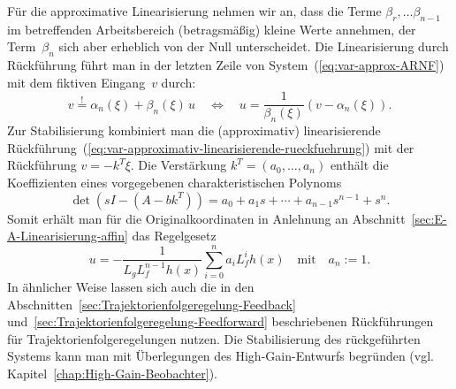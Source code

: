 Für die approximative Linearisierung
nehmen wir an, dass die Terme $\beta_{r},\ldots\beta_{n-1}$ im betreffenden
Arbeitsbereich (betragsmäßig) kleine Werte annehmen, der Term~$\beta_{n}$
sich aber erheblich von der Null unterscheidet. Die Linearisierung
durch Rückführung führt man in der letzten Zeile von System~(\ref{eq:var-approx-ARNF})
mit dem fiktiven Eingang~$v$ durch:
\begin{equation}
v\stackrel{!}{=}\alpha_{n}(\xi)+\beta_{n}(\xi)\,u\quad\Longleftrightarrow\quad u=\frac{1}{\beta_{n}(\xi)}\left(v-\alpha_{n}(\xi)\right).\label{eq:var-approximativ-linearisierende-rueckfuehrung}
\end{equation}
Zur Stabilisierung kombiniert man die (approximativ) linearisierende
Rückführung~(\ref{eq:var-approximativ-linearisierende-rueckfuehrung})
mit der Rückführung $v=-k^{T}\xi$. Die Verstärkung $k^{T}=(a_{0},\ldots,a_{n})$
enthält die Koeffizienten eines vorgegebenen charakteristischen Polynoms
\begin{equation}
\det\left(sI-\left(A-bk^{T}\right)\right)=a_{0}+a_{1}s+\cdots+a_{n-1}s^{n-1}+s^{n}.\label{eq:var-al-char-poly}
\end{equation}
Somit erhält man für die Originalkoordinaten in Anlehnung an Abschnitt~\ref{sec:E-A-Linearisierung-affin}
das Regelgesetz
\begin{equation}
u=-\frac{1}{L_{g}L_{f}^{n-1}h(x)}\sum_{i=0}^{n}a_{i}L_{f}^{i}h(x)\quad\text{mit}\quad a_{n}:=1.\label{eq:var-approx-rueckfuehrung-x}
\end{equation}
In ähnlicher Weise lassen sich auch die in den Abschnitten~\ref{sec:Trajektorienfolgeregelung-Feedback}
und~\ref{sec:Trajektorienfolgeregelung-Feedforward} beschriebenen
Rückführungen für Trajektorienfolgeregelungen nutzen. Die Stabilisierung
des rückgeführten Systems kann man mit Überlegungen des High-Gain-Entwurfs
begründen (vgl. Kapitel~\ref{chap:High-Gain-Beobachter}). 

\medskip{}

